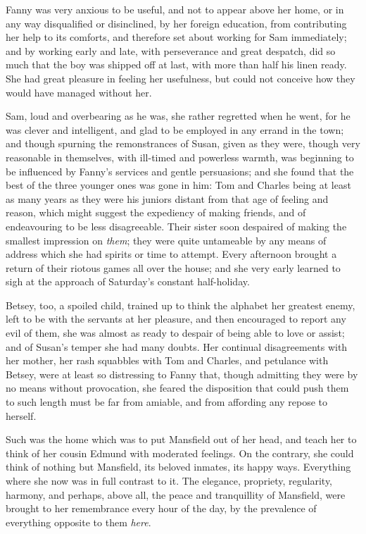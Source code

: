 Fanny was very anxious to be useful, and not to appear above her home, or in any way disqualified or disinclined, by her foreign education, from contributing her help to its comforts, and therefore set about working for Sam immediately; and by working early and late, with perseverance and great despatch, did so much that the boy was shipped off at last, with more than half his linen ready. She had great pleasure in feeling her usefulness, but could not conceive how they would have managed without her.

Sam, loud and overbearing as he was, she rather regretted when he went, for he was clever and intelligent, and glad to be employed in any errand in the town; and though spurning the remonstrances of Susan, given as they were, though very reasonable in themselves, with ill-timed and powerless warmth, was beginning to be influenced by Fanny's services and gentle persuasions; and she found that the best of the three younger ones was gone in him: Tom and Charles being at least as many years as they were his juniors distant from that age of feeling and reason, which might suggest the expediency of making friends, and of endeavouring to be less disagreeable. Their sister soon despaired of making the smallest impression on \textit{them}; they were quite untameable by any means of address which she had spirits or time to attempt. Every afternoon brought a return of their riotous games all over the house; and she very early learned to sigh at the approach of Saturday's constant half-holiday.

Betsey, too, a spoiled child, trained up to think the alphabet her greatest enemy, left to be with the servants at her pleasure, and then encouraged to report any evil of them, she was almost as ready to despair of being able to love or assist; and of Susan's temper she had many doubts. Her continual disagreements with her mother, her rash squabbles with Tom and Charles, and petulance with Betsey, were at least so distressing to Fanny that, though admitting they were by no means without provocation, she feared the disposition that could push them to such length must be far from amiable, and from affording any repose to herself.

Such was the home which was to put Mansfield out of her head, and teach her to think of her cousin Edmund with moderated feelings. On the contrary, she could think of nothing but Mansfield, its beloved inmates, its happy ways. Everything where she now was in full contrast to it. The elegance, propriety, regularity, harmony, and perhaps, above all, the peace and tranquillity of Mansfield, were brought to her remembrance every hour of the day, by the prevalence of everything opposite to them \textit{here}.

